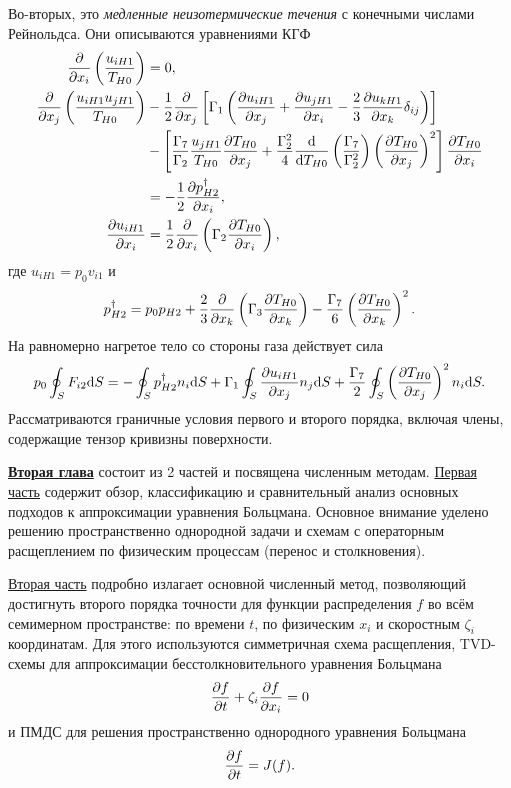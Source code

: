 Во-вторых, это \emph{медленные неизотермические течения} с конечными числами Рейнольдса.
Они описываются уравнениями КГФ
\begin{align*}
    \pder{x_i}\left(\frac{u_{iH1}}{T_{H0}}\right) &= 0, \\
    \pder{x_j}\left(\frac{u_{iH1}u_{jH1}}{T_{H0}}\right)
        &-\frac12\pder{x_j}\left[\Gamma_1\left(
            \pder[u_{iH1}]{x_j} + \pder[u_{jH1}]{x_i} - \frac23\pder[u_{kH1}]{x_k}\delta_{ij}
        \right)\right] \\
        &-\left[
            \frac{\Gamma_7}{\Gamma_2}\frac{u_{jH1}}{T_{H0}}\pder[T_{H0}]{x_j}
            + \frac{\Gamma_2^2}4 \der{T_{H0}}\left(\frac{\Gamma_7}{\Gamma_2^2}\right)
                \left(\pder[T_{H0}]{x_j}\right)^2
        \right]\pder[T_{H0}]{x_i} \\
        &= -\frac12\pder[p_{H2}^\dag]{x_i}, \\
    \pder[u_{iH1}]{x_i} &= \frac12\pder{x_i}\left(\Gamma_2\pder[T_{H0}]{x_i}\right),
\end{align*}
где \(u_{iH1} = p_0v_{i1}\) и
\begin{equation*}
    p_{H2}^\dag = p_0 p_{H2}
        + \frac23\pder{x_k}\left(\Gamma_3\pder[T_{H0}]{x_k}\right)
        - \frac{\Gamma_7}{6}\left(\pder[T_{H0}]{x_k}\right)^2.
\end{equation*}
На равномерно нагретое тело со стороны газа действует сила
\begin{equation*}
    p_0 \oint_S F_{i2} \dd{S} =
        - \oint_S p_{H2}^\dag n_i \dd{S} \\
        + \Gamma_1 \oint_S \pder[u_{iH1}]{x_j} n_j \dd{S}
        + \frac{\Gamma_7}{2} \oint_S \left(\pder[T_{H0}]{x_j}\right)^2 n_i \dd{S}.
\end{equation*}
Рассматриваются граничные условия первого и второго порядка, включая члены, содержащие тензор кривизны поверхности.


\underline{\textbf{Вторая глава}} состоит из 2 частей и посвящена численным методам.
\underline{Первая часть} содержит обзор, классификацию и сравнительный анализ основных подходов к аппроксимации уравнения Больцмана.
Основное внимание уделено решению пространственно однородной задачи и схемам с операторным расщеплением
по физическим процессам (перенос и столкновения).

\underline{Вторая часть} подробно излагает основной численный метод,
позволяющий достигнуть второго порядка точности для функции распределения \(f\) во всём семимерном пространстве:
по времени \(t\), по физическим \(x_i\) и скоростным \(\zeta_i\) координатам.
Для этого используются симметричная схема расщепления, TVD-схемы для аппроксимации
бесстолкновительного уравнения Больцмана
\begin{equation*}
    \pder[f]{t} + \zeta_i\pder[f]{x_i} = 0
\end{equation*}
и ПМДС для решения пространственно однородного уравнения Больцмана
\begin{equation*}
    \pder[f]{t} = J(f).
\end{equation*}

